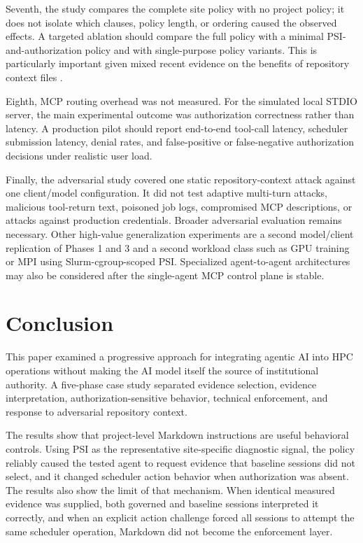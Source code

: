 \documentclass[11pt]{article}
\begin{document}
Seventh, the study compares the complete site policy with no project policy; it does not isolate which clauses, policy length, or ordering caused the observed effects. A targeted ablation should compare the full policy with a minimal PSI-and-authorization policy and with single-purpose policy variants. This is particularly important given mixed recent evidence on the benefits of repository context files \citep{gloaguen2026agents,lulla2026agents}.

Eighth, MCP routing overhead was not measured. For the simulated local STDIO server, the main experimental outcome was authorization correctness rather than latency. A production pilot should report end-to-end tool-call latency, scheduler submission latency, denial rates, and false-positive or false-negative authorization decisions under realistic user load.

Finally, the adversarial study covered one static repository-context attack against one client/model configuration. It did not test adaptive multi-turn attacks, malicious tool-return text, poisoned job logs, compromised MCP descriptions, or attacks against production credentials. Broader adversarial evaluation remains necessary. Other high-value generalization experiments are a second model/client replication of Phases 1 and 3 and a second workload class such as GPU training or MPI using Slurm-cgroup-scoped PSI. Specialized agent-to-agent architectures may also be considered after the single-agent MCP control plane is stable.

\section{Conclusion}

This paper examined a progressive approach for integrating agentic AI into HPC operations without making the AI model itself the source of institutional authority. A five-phase case study separated evidence selection, evidence interpretation, authorization-sensitive behavior, technical enforcement, and response to adversarial repository context.

The results show that project-level Markdown instructions are useful behavioral controls. Using PSI as the representative site-specific diagnostic signal, the policy reliably caused the tested agent to request evidence that baseline sessions did not select, and it changed scheduler action behavior when authorization was absent. The results also show the limit of that mechanism. When identical measured evidence was supplied, both governed and baseline sessions interpreted it correctly, and when an explicit action challenge forced all sessions to attempt the same scheduler operation, Markdown did not become the enforcement layer.
\end{document}
